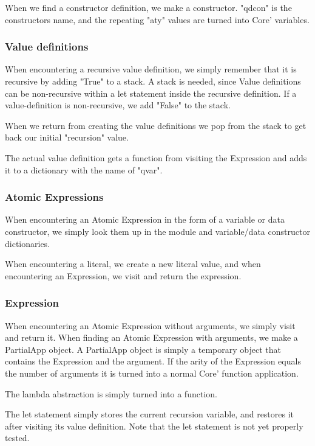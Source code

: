 When we find a constructor definition, we make a constructor. "qdcon" is the 
constructors name, and the repeating "aty" values are turned into Core' variables.

\subsubsection*{Value definitions}

When encountering a recursive value definition, we simply remember that it is
recursive by adding "True" to a stack. A stack is needed, since Value definitions
can be non-recursive within a let statement inside the recursive definition. If
a value-definition is non-recursive, we add "False" to the stack.

When we return from creating the value definitions we pop from the stack to get
back our initial "recursion" value.

The actual value definition gets a function from visiting the Expression and adds 
it to a dictionary with the name of "qvar".

\subsubsection*{Atomic Expressions}

When encountering an Atomic Expression in the form of a variable or data constructor, 
we simply look them up in the module and variable/data constructor dictionaries.

When encountering a literal, we create a new literal value, and when encountering an
Expression, we visit and return the expression.

\subsubsection*{Expression}

When encountering an Atomic Expression without arguments, we simply visit and return
it. When finding an Atomic Expression with arguments, we make a PartialApp object.
A PartialApp object is simply a temporary object that contains the Expression and the
argument. If the arity of the Expression equals the number of arguments it is turned
into a normal Core' function application.

The lambda abstraction is simply turned into a function.

The let statement simply stores the current recursion variable, and restores it after
visiting its value definition. Note that the let statement is not yet properly tested.

